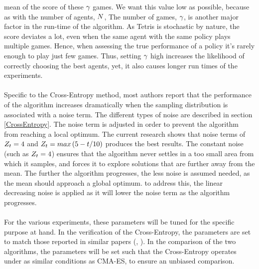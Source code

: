mean of the score of these 
$\gamma$ games.
We want this value low as possible, because as with the number of
agents, $N$, The number of games, $\gamma$, 
is another major factor in the run-time of the algorithm.
As Tetris is stochastic by nature, the score deviates a lot, 
even when the
same agent with the same policy plays multiple games. 
Hence, when assessing the true
performance of a policy it's rarely enough to play just few games. Thus, setting 
$\gamma$ high increases the likelihood of correctly choosing the best 
agents, yet, it also causes longer run times of the experiments.\\
\\
Specific to the Cross-Entropy method, 
most authors report that the performance of the 
algorithm increases dramatically when the sampling 
distribution is associated with
a noise term. The different types of 
noise are described in section \ref{CrossEntropy}.
The noise term is adjusted in order to 
prevent the algorithm from reaching a local optimum.
The current research shows that noise terms of $Z_t = 4$ and 
$Z_t = max \left( 5 - t / 10 \right)$ 
\citep{thiery:09} produces the best results.
The constant noise (such as $Z_t = 4$) ensures that the algorithm
never settles in a too small area from which it samples, and forces it to explore
solutions that are further away from the mean. The further the 
algorithm progresses, 
the less noise is assumed needed, as the mean should approach a global optimum. to
address this, the linear decreasing noise 
is applied as it will lower the noise term
as the algorithm progresses.\\
\\
For the various experiments, these 
parameters will be tuned for the specific purpose 
at hand. In the verification of the Cross-Entropy, the parameters are set 
to match those reported in similar papers (\cite{thiery:09}, \cite{szita:06}).
In the comparison of the two algorithms, the parameters will be set such that 
the Cross-Entropy operates under as 
similar conditions as CMA-ES, to ensure an unbiased 
comparison.


